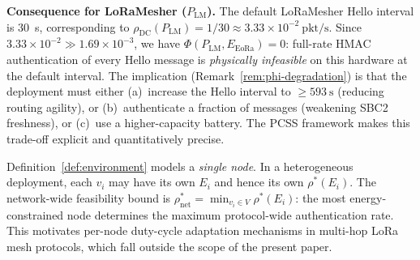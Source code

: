 \begin{example}
\medskip
\noindent\textbf{Consequence for LoRaMesher ($P_{\mathrm{LM}}$).}\;
The default LoRaMesher Hello interval is 30~s, corresponding to
$\rho_{\mathrm{DC}}(P_{\mathrm{LM}}) = 1/30 \approx 3.33 \times 10^{-2}\ \mathrm{pkt/s}$.
Since $3.33 \times 10^{-2} \gg 1.69 \times 10^{-3}$, we have
$\Phi(P_{\mathrm{LM}}, E_{\mathrm{EoRa}}) = 0$: full-rate HMAC
authentication of every Hello message is \emph{physically infeasible} on
this hardware at the default interval.  The implication (Remark~\ref{rem:phi-degradation})
is that the deployment must either (a)~increase the Hello interval to
$\ge 593\ \mathrm{s}$ (reducing routing agility), or (b)~authenticate a
fraction of messages (weakening SBC2 freshness), or (c)~use a higher-capacity
battery.  The PCSS framework makes this trade-off explicit and
quantitatively precise.
\end{example}

\begin{remark}
\label{rem:scope}
Definition~\ref{def:environment} models a \emph{single node}.  In a
heterogeneous deployment, each $v_i$ may have its own $E_i$ and hence
its own $\rho^*(E_i)$.  The network-wide feasibility bound is
$\rho^*_{\mathrm{net}} = \min_{v_i \in V} \rho^*(E_i)$: the most
energy-constrained node determines the maximum protocol-wide
authentication rate.  This motivates per-node duty-cycle adaptation
mechanisms in multi-hop LoRa mesh protocols, which fall outside the scope
of the present paper.
\end{remark}
